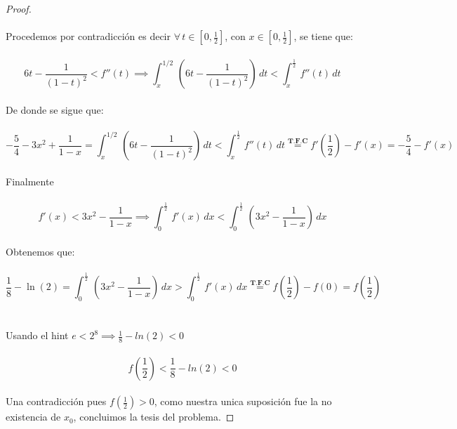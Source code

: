 \documentclass[11pt,letterpaper]{article}
\begin{document}
\begin{proof}\,\\
    \,\\
    Procedemos por contradicci\'on es decir $\forall\,t\in\left[0,\frac{1}{2}\right]$, con $x\in \left[0,\frac{1}{2}\right]$, se tiene que:\,\\
    \,\\
    \begin{equation*}
        6t-\frac{1}{(1-t)^2}<f''(t)\implies \int_{x}^{1/2}\,\left(6t-\frac{1}{(1-t)^2}\right)\,dt<\int_{x}^{\frac{1}{2}}\,f''(t)\,dt
    \end{equation*}\,\\
    De donde se sigue que:\,\\
    \,\\
    \begin{equation*}
        -\frac{5}{4}-3x^2+\frac{1}{1-x}=\int_{x}^{1/2}\,\left(6t-\frac{1}{(1-t)^2}\right)\,dt<\int_{x}^{\frac{1}{2}}\,f''(t)\,dt\stackrel{\textbf{T.F.C}}{=}f'\left(\frac{1}{2}\right)-f'(x)=-\frac{5}{4}-f'(x)
    \end{equation*}\,\\
    Finalmente\,\\
    \,\\
    \begin{equation*}
        f'(x)<3x^2-\frac{1}{1-x}\implies\int_{0}^{\frac{1}{2}}\,f'(x)\,dx<\int_{0}^{\frac{1}{2}}\,\left(3x^2-\frac{1}{1-x}\right)\,dx
    \end{equation*}\,\\
    Obtenemos que:\,\\
    \,\\
    \begin{equation*}
        \frac{1}{8}-\ln(2)=\int_{0}^{\frac{1}{2}}\,\left(3x^2-\frac{1}{1-x}\right)\,dx>\int_{0}^{\frac{1}{2}}\,f'(x)\,dx\stackrel{\textbf{T.F.C}}{=}f\left(\frac{1}{2}\right)-f(0)=f\left(\frac{1}{2}\right)
    \end{equation*}\,\\
    \,\\
    Usando el hint $e<2^8\implies\frac{1}{8}-ln(2)<0$\,\\
    \,\\
    \begin{equation*}
        f\left(\frac{1}{2}\right)<\frac{1}{8}-ln(2)<0
    \end{equation*}\,\\
    Una contradicci\'on pues $f\left(\frac{1}{2}\right)>0$, como nuestra unica suposici\'on fue la no existencia de $x_0$, concluimos la tesis del problema.
\end{proof}
\end{document}
